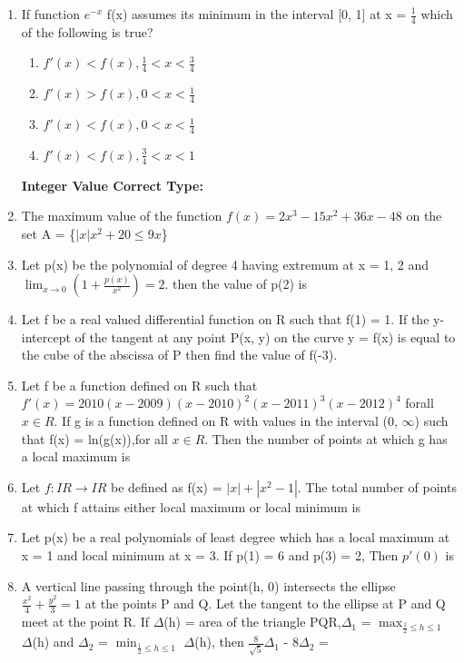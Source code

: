 \begin{enumerate}[label=\arabic*.,ref=\thesubsection.\theenumi]
\item If function $e^{-x}$ f(x) assumes its minimum in the interval [0, 1] at x = $\frac{1}{4}$ which of the following is true?
\begin{enumerate}
\item $f'(x) < f(x), \frac{1}{4} < x < \frac{3}{4}$
\item $f'(x) > f(x),  0 < x < \frac{1}{4}$
\item $f'(x) < f(x),  0 < x < \frac{1}{4}$
\item $f'(x) < f(x),  \frac{3}{4} < x < 1$
\end{enumerate}

\textbf{Integer Value Correct Type:}

\item The maximum value of the function $f(x) = 2x^3 - 15x^2 + 36x - 48$ on the set A = \{$|x|x^2 + 20 \leq 9x$\}

\item Let p(x) be the polynomial of degree 4 having extremum at x = 1, 2 and $\lim_{x \to 0}(1 + \frac{p(x)}{x^2}) = 2$. then the value of p(2) is

\item Let f be a real valued differential function on R such that f(1) = 1. If the y-intercept of the tangent at any point P(x, y) on the curve y = f(x) is equal to the cube of the abscissa of P then find the value of f(-3).

\item Let f be a function defined on R such that $f'(x) = 2010(x - 2009)(x - 2010)^2(x - 2011)^3(x - 2012)^4$ forall 
$x \in R$. If g is a function defined on R with values in the interval (0, $\infty$) such that f(x) = ln(g(x)),for all 
$x \in R$. Then the number of points at which g has a local maximum is

\item Let $f: IR \to IR$ be defined as f(x) = $|x| + |x^2 - 1|$. The total number of points at which f attains either local maximum or local minimum is 

\item Let p(x) be a real polynomials of least degree which has a local maximum at x = 1 and local minimum at x = 3. If p(1) = 6 and p(3) = 2, Then $p'(0)$ is
 
\item A vertical line passing through the point(h, 0) intersects the ellipse $\frac{x^2}{4} + \frac{y^2}{3} = 1$ at the points P and Q. Let the tangent to the ellipse at P and Q meet at the point R. If $\Delta$(h) = area of the triangle PQR,$\Delta_1$ = $\max_{\frac{1}{2}\leq h \leq 1}$ $\Delta$(h) and $\Delta_2$ = $\min_{\frac{1}{2}\leq h \leq 1}$ $\Delta$(h), then $\frac{8}{\sqrt{5}}\Delta_1$ - $8\Delta_2$ =


\end{enumerate}
